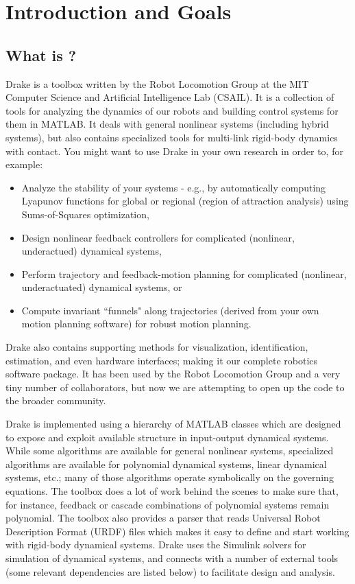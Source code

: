 \chapter{Introduction and Goals}



\section{What is \drake?}

Drake is a toolbox written by the Robot Locomotion Group at the MIT Computer Science and Artificial Intelligence Lab (CSAIL). It is a collection of tools for analyzing the dynamics of our robots and building control systems for them in MATLAB. It deals with general nonlinear systems (including hybrid systems), but also contains specialized tools for multi-link rigid-body dynamics with contact. You might want to use Drake in your own research in order to, for example:
\begin{itemize}
\item Analyze the stability of your systems - e.g., by automatically computing Lyapunov functions for global or regional (region of attraction analysis) using Sums-of-Squares optimization,
\item Design nonlinear feedback controllers for complicated (nonlinear, underactued) dynamical systems,
\item Perform trajectory and feedback-motion planning for complicated (nonlinear, underactuated) dynamical systems, or
\item Compute invariant ``funnels" along trajectories (derived from your own motion planning software) for robust motion planning. 
\end{itemize}

Drake also contains supporting methods for visualization, identification, estimation, and even hardware interfaces; making it our complete robotics software package. It has been used by the Robot Locomotion Group and a very tiny number of collaborators, but now we are attempting to open up the code to the broader community.

Drake is implemented using a hierarchy of MATLAB classes which are designed to expose and exploit available structure in input-output dynamical systems. While some algorithms are available for general nonlinear systems, specialized algorithms are available for polynomial dynamical systems, linear dynamical systems, etc.; many of those algorithms operate symbolically on the governing equations. The toolbox does a lot of work behind the 
scenes to make sure that, for instance, feedback or cascade combinations of polynomial systems remain polynomial. The toolbox also provides a parser that reads Universal Robot Description Format (URDF) files which makes it easy to define and start working with rigid-body dynamical systems. Drake uses the Simulink solvers for simulation of dynamical systems, and connects with a number of external tools (some relevant dependencies are listed below) to facilitate design and analysis. 

